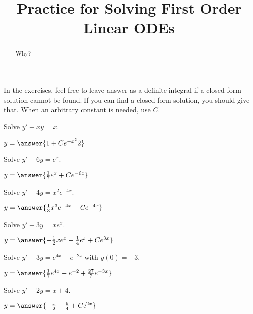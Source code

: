 \documentclass{ximera}
\title{Practice for Solving First Order Linear ODEs}
\begin{document}
\begin{abstract}
    Why?
\end{abstract}
\maketitle


In the exercises, feel free to leave answer as a definite integral if a closed form solution cannot be found.  
If you can find a closed form solution, you should give that. 
When an arbitrary constant is needed, use $C$.

\begin{exercise}
    Solve $y' + xy = x$.
    
    $y = \answer{1 + Ce^{-x^2}{2}}$
\end{exercise}

\begin{exercise}
    Solve $y' + 6y = e^x$.
    
    $y = \answer{\frac{1}{7}e^x + Ce^{-6x}}$
\end{exercise}

\begin{exercise}
    Solve $y' + 4y = x^2e^{-4x}$.
    
    $y = \answer{\frac{1}{3}x^3e^{-4x} + Ce^{-4x}}$
\end{exercise}

\begin{exercise}
    Solve $y' - 3y = xe^x$.
    
    $y = \answer{-\frac{1}{2}xe^{x} - \frac{1}{4}e^x + Ce^{3x}}$
\end{exercise}

\begin{exercise}
    Solve $y' + 3y = e^{4x} - e^{-2x}$ with $y(0) = -3$.
    
    $y = \answer{\frac{1}{7}e^{4x} - e^{-2} + \frac{27}{7}e^{-3x}}$
\end{exercise}

\begin{exercise}
    Solve $y' - 2y = x + 4$.
    
    $y = \answer{-\frac{x}{2} - \frac{9}{4} + Ce^{2x}}$
\end{exercise}
\end{document}
